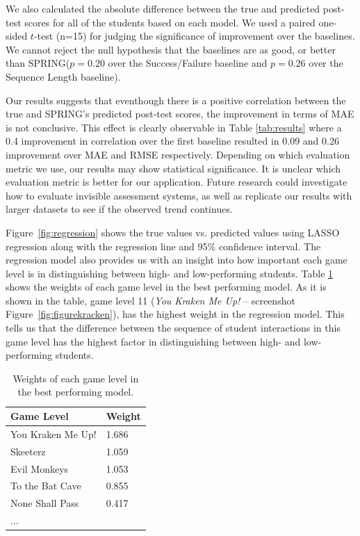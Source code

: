\documentclass{sigchi}
\def\algname{SPRING\xspace}
\begin{document}
	We also calculated the absolute difference between the true and predicted post-test scores for all of the students based on each model.
	We used a paired one-sided $t$-test (n=15) for judging the significance of improvement over the baselines.
	We cannot reject the null hypothesis that the baselines are as good, or better than  \algname ($p=0.20$ over the Success/Failure baseline and $p=0.26$ over the Sequence Length baseline).
	
	Our results suggests that eventhough there is a positive correlation between the true and \algname's predicted post-test scores, the improvement in terms of MAE is not conclusive. 
	This effect is clearly observable in Table \ref{tab:results} where a 0.4 improvement in correlation over the first baseline resulted in 0.09 and 0.26 improvement over MAE and RMSE respectively. 
	Depending on which evaluation metric we use, our results may show statistical significance.
	It is unclear which evaluation metric is better for our application.
	Future research could investigate how to evaluate invisible assessment systems, as well as replicate our results with larger datasets to see if the observed trend continues.
	
	
	Figure~\ref{fig:regression} shows the true values vs. predicted values using LASSO regression along with the regression line and 95\% confidence interval.
	The regression model also provides us with an insight into how important each game level is in distinguishing between high- and low-performing students. Table \ref{tab:regrweights} shows the weights of each game level in the best performing model.
	As it is shown in the table, game level 11 (\textit{You Kraken Me Up!} -- screenshot Figure~\ref{fig:figurekracken}), has the highest weight in the regression model. 
	This tells us that the difference between the sequence of student interactions in this game level has the highest factor in distinguishing between high- and low-performing students.
	
	\begin{table}[b]
		\centering
		\begin{tabular}{ll}
			\hline
			\textbf{Game Level} & \textbf{Weight} \\ \hline
			You Kraken Me Up!   & 1.686                               \\
			Skeeterz            & 1.059                               \\
			Evil Monkeys        & 1.053                               \\
			To the Bat Cave     & 0.855                               \\
			None Shall Pass     & 0.417                               \\
			...                 &                                    
		\end{tabular}
		\caption{Weights of each game level in the best performing model.}
		\label{tab:regrweights}	
	\end{table}
	
\end{document}
